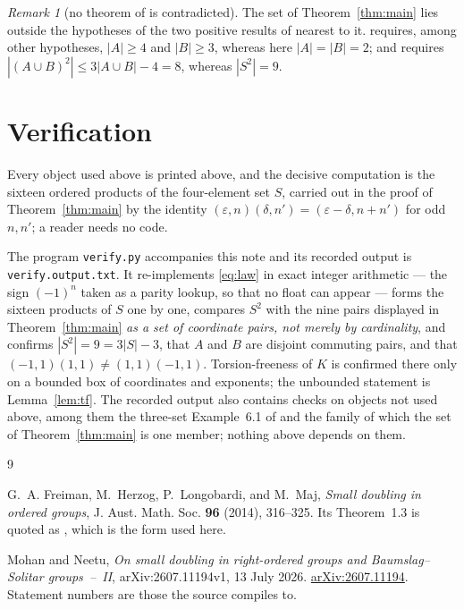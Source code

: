 \documentclass[11pt]{amsart}
\theoremstyle{remark}
\newtheorem{remark}[theorem]{Remark}
\newcommand{\K}{K}
\begin{document}
\begin{remark}[no theorem of \cite{MN} is contradicted]
The set of Theorem~\ref{thm:main} lies outside the hypotheses of the two
positive results of \cite{MN} nearest to it. \cite[Theorem~2.10]{MN} requires,
among other hypotheses, $|A|\ge4$ and $|B|\ge3$, whereas here $|A|=|B|=2$;
and \cite[Theorem~2.7]{MN} requires
$|(A\cup B)^{2}|\le3|A\cup B|-4=8$, whereas $|S^{2}|=9$.
\end{remark}

\section{Verification}

Every object used above is printed above, and the decisive computation is the
sixteen ordered products of the four-element set $S$, carried out in the proof
of Theorem~\ref{thm:main} by the identity
$(\varepsilon,n)(\delta,n')=(\varepsilon-\delta,n+n')$ for odd $n,n'$; a reader
needs no code.

The program \texttt{verify.py} accompanies this note and its recorded output is
\texttt{verify.output.txt}. It re-implements \eqref{eq:law} in exact integer
arithmetic --- the sign $(-1)^{n}$ taken as a parity lookup, so that no float
can appear --- forms the sixteen products of $S$ one by one, compares $S^{2}$
with the nine pairs displayed in Theorem~\ref{thm:main} \emph{as a set of
coordinate pairs, not merely by cardinality}, and confirms $|S^{2}|=9=3|S|-3$,
that $A$ and $B$ are disjoint commuting pairs, and that
$(-1,1)(1,1)\ne(1,1)(-1,1)$. Torsion-freeness of $\K$ is confirmed there only
on a bounded box of coordinates and exponents; the unbounded statement is
Lemma~\ref{lem:tf}. The recorded output also contains checks on objects not
used above, among them the three-set Example~6.1 of \cite{MN} and the family of
which the set of Theorem~\ref{thm:main} is one member; nothing above depends on
them.

\begin{thebibliography}{9}

G.~A. Freiman, M.~Herzog, P.~Longobardi, and M.~Maj,
\emph{Small doubling in ordered groups},
J. Aust. Math. Soc. \textbf{96} (2014), 316--325.
Its Theorem~1.3 is quoted as \cite[Theorem~2.3]{MN}, which is the form used
here.

Mohan and Neetu,
\emph{On small doubling in right-ordered groups and Baumslag--Solitar
groups~--~II},
arXiv:2607.11194v1, 13 July 2026.
\href{https://arxiv.org/abs/2607.11194}{arXiv:2607.11194}.
Statement numbers are those the source compiles to.

\end{thebibliography}
\end{document}
